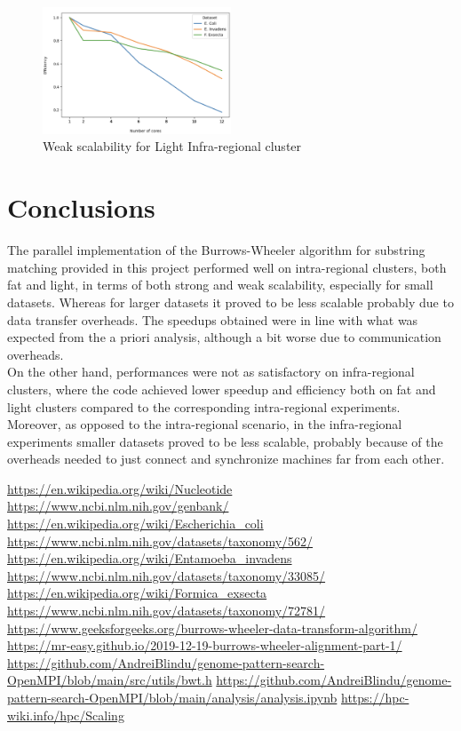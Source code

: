 \documentclass[final,5p,times,twocolumn,authoryear]{elsarticle}
\begin{document}
\begin{figure}
    \centering
    \includegraphics[width=0.5\textwidth]{images/light_infra_weak.png}
    \caption{Weak scalability for Light Infra-regional cluster }
    \label{fig:light-infra-weak}
\end{figure}

\section{Conclusions}
The parallel implementation of the Burrows-Wheeler algorithm for substring matching provided in this project performed well on intra-regional clusters, both fat and light, in terms of both strong and weak scalability, especially for small datasets. Whereas for larger datasets it proved to be less scalable probably due to data transfer overheads. The speedups obtained were in line with what was expected from the a priori analysis, although a bit worse due to communication overheads. \\
On the other hand, performances were not as satisfactory on infra-regional clusters, where the code achieved lower speedup and efficiency both on fat and light clusters compared to the corresponding intra-regional experiments. Moreover, as opposed to the intra-regional scenario, in the infra-regional experiments smaller datasets proved to be less scalable, probably because of the overheads needed to just connect and synchronize machines far from each other.


\begin{thebibliography}{9}
 \url{https://en.wikipedia.org/wiki/Nucleotide}
 \url{https://www.ncbi.nlm.nih.gov/genbank/}
 \url{https://en.wikipedia.org/wiki/Escherichia_coli}
 \url{https://www.ncbi.nlm.nih.gov/datasets/taxonomy/562/}
 \url{https://en.wikipedia.org/wiki/Entamoeba_invadens}
 \url{https://www.ncbi.nlm.nih.gov/datasets/taxonomy/33085/}
 \url{https://en.wikipedia.org/wiki/Formica_exsecta}
 \url{https://www.ncbi.nlm.nih.gov/datasets/taxonomy/72781/}
\url{https://www.geeksforgeeks.org/burrows-wheeler-data-transform-algorithm/}
\url{https://mr-easy.github.io/2019-12-19-burrows-wheeler-alignment-part-1/}
\url{https://github.com/AndreiBlindu/genome-pattern-search-OpenMPI/blob/main/src/utils/bwt.h}
\url{https://github.com/AndreiBlindu/genome-pattern-search-OpenMPI/blob/main/analysis/analysis.ipynb}
\url{https://hpc-wiki.info/hpc/Scaling}
\end{thebibliography}
\end{document}
